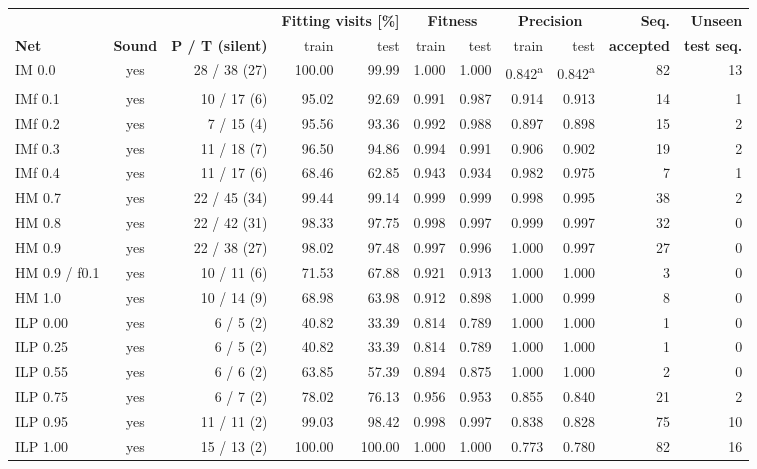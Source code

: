 \begin{table}[htbp]
\centering
\footnotesize
\setlength{\tabcolsep}{3pt}
\begin{tabular}{lcrrrrrrrrr}
\toprule
 & & & \multicolumn{2}{c}{\textbf{Fitting visits [\%]}} & \multicolumn{2}{c}{\textbf{Fitness}} & \multicolumn{2}{c}{\textbf{Precision}} & \textbf{Seq.} & \textbf{Unseen} \\
\textbf{Net} & \textbf{Sound} & \textbf{P / T (silent)} & train & test & train & test & train & test & \textbf{accepted} & \textbf{test seq.} \\
\midrule
IM 0.0 & yes & 28 / 38 (27) & 100.00 & 99.99 & 1.000 & 1.000 & 0.842\textsuperscript{a} & 0.842\textsuperscript{a} & 82 & 13 \\
IMf 0.1 & yes & 10 / 17 (6) & 95.02 & 92.69 & 0.991 & 0.987 & 0.914 & 0.913 & 14 & 1 \\
IMf 0.2 & yes & 7 / 15 (4) & 95.56 & 93.36 & 0.992 & 0.988 & 0.897 & 0.898 & 15 & 2 \\
IMf 0.3 & yes & 11 / 18 (7) & 96.50 & 94.86 & 0.994 & 0.991 & 0.906 & 0.902 & 19 & 2 \\
IMf 0.4 & yes & 11 / 17 (6) & 68.46 & 62.85 & 0.943 & 0.934 & 0.982 & 0.975 & 7 & 1 \\
HM 0.7 & yes & 22 / 45 (34) & 99.44 & 99.14 & 0.999 & 0.999 & 0.998 & 0.995 & 38 & 2 \\
HM 0.8 & yes & 22 / 42 (31) & 98.33 & 97.75 & 0.998 & 0.997 & 0.999 & 0.997 & 32 & 0 \\
HM 0.9 & yes & 22 / 38 (27) & 98.02 & 97.48 & 0.997 & 0.996 & 1.000 & 0.997 & 27 & 0 \\
HM 0.9 / f0.1 & yes & 10 / 11 (6) & 71.53 & 67.88 & 0.921 & 0.913 & 1.000 & 1.000 & 3 & 0 \\
HM 1.0 & yes & 10 / 14 (9) & 68.98 & 63.98 & 0.912 & 0.898 & 1.000 & 0.999 & 8 & 0 \\
ILP 0.00 & yes & 6 / 5 (2) & 40.82 & 33.39 & 0.814 & 0.789 & 1.000 & 1.000 & 1 & 0 \\
ILP 0.25 & yes & 6 / 5 (2) & 40.82 & 33.39 & 0.814 & 0.789 & 1.000 & 1.000 & 1 & 0 \\
ILP 0.55 & yes & 6 / 6 (2) & 63.85 & 57.39 & 0.894 & 0.875 & 1.000 & 1.000 & 2 & 0 \\
ILP 0.75 & yes & 6 / 7 (2) & 78.02 & 76.13 & 0.956 & 0.953 & 0.855 & 0.840 & 21 & 2 \\
ILP 0.95 & yes & 11 / 11 (2) & 99.03 & 98.42 & 0.998 & 0.997 & 0.838 & 0.828 & 75 & 10 \\
ILP 1.00 & yes & 15 / 13 (2) & 100.00 & 100.00 & 1.000 & 1.000 & 0.773 & 0.780 & 82 & 16 \\

\end{tabular}
\end{table}
